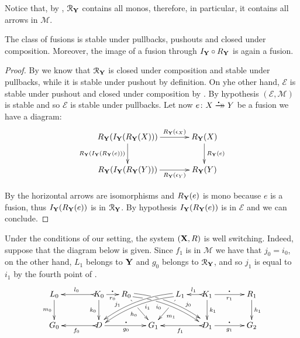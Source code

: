 \documentclass[a4paper,UKenglish,cleveref,pdftex,thm-restate,numberwithinsect]{lipics-v2021}
\newcommand{\xrightarrowdbl}[2][]{%
	\xrightarrow[#1]{#2}\mathrel{\mkern-14mu}\rightarrow
}
\newcommand{\mini}[0]{\scalebox{.4}{$\bullet$}}
\newcommand{\fto}[0]{\xrightarrowdbl{\mini}}
\def\R{\mathsf{R}}
\def\X{\textbf {\textup{X}}}
\def\Y{\textbf {\textup{Y}}}
\def\G{\textbf {\textup{G}}}
\begin{document}
\begin{remark}\label{rem:cont}
	Notice that, by , $\mathcal{R}_\Y$ contains all monos, therefore, in particular, it contains all arrows in $\mathcal{M}$.
\end{remark}

\begin{proposition}\label{prop:fusion}
	The class of fusions is stable under pullbacks, pushouts and closed under composition. Moreover, the image of a fusion through $I_\Y\circ R_{\Y}$ is again a fusion.
\end{proposition}
\begin{proof}
	By  we know that $\mathcal{R}_\Y$ is closed under composition and stable under pullbacks, while it is stable under pushout by definition. On yhe other hand, $\mathcal{E}$ is stable under pushout and closed under composition by . By hypothesis $(\mathcal{E}, \mathcal{M})$ is stable and so $\mathcal{E}$ is stable under pullbacks. Let now $e\colon X\fto Y$ be a fusion we have a diagram:
	\[\xymatrix@C=35pt{R_\Y(I_\Y(R_{\Y}(X))) \ar[r]^-{R_\Y(\epsilon_X)} \ar[d]_{R_\Y(I_\Y(R_\Y(e)))}&R_{\Y}(X) \ar[d]^{R_\Y(e)}\\R_\Y(I_\Y(R_{\Y}(Y))) \ar[r]_-{R_\Y(\epsilon_Y)}&R_\Y(Y)}\]
	
	By  the horizontal arrows are isomorphisms and $R_\Y(e)$ is mono because $e$ is a fusion, thus $I_\Y(R_\Y(e))$ is in $\mathcal{R}_\Y$. By hypothesis $I_\Y(R_\Y(e))$ is in $\mathcal{E}$ and we can conclude.
\end{proof}

\begin{example}
\end{example}

\begin{remark}\label{rem:ws}
Under the conditions of our setting, the system $(\X, \R)$ is well switching. Indeed, suppose that the diagram below is given. Since $f_1$ is in $\mathcal{M}$ we have that $j_0=i_0$, on the other hand, $L_1$ belongs to $\Y$ and $g_0$ belongs to $\mathcal{R}_\Y$, and so $j_1$ is equal to $i_1$ by the fourth point of .
	\[\xymatrix@C=15pt{L_0 \ar[d]_{m_0}&& K_0 \ar[d]_{k_0}\ar@{>->}[ll]_{l_0} \ar[r]_{r_0}^{\mini} & R_0 \ar@/^.3cm/@<-.5ex>[drrr]|(.22)\hole|(.32)\hole_(.4){i_0} \ar@<.5ex>@/^.3cm/[drrr]|(.3)\hole|(.39)\hole^(.7){j_0} \ar[dr]|(.29)\hole|(.35)\hole_{h_0} && L_1 \ar@<.5ex>@/_.3cm/[dlll]^(.4){i_1} \ar@<-.5ex>@/_.3cm/[dlll]_(.7){j_1} \ar[dl]|(.29)\hole|(.35)\hole^(.6){m_1}& K_1\ar[d]^{k_1}\ar@{>->}[l]_{l_1} \ar[rr]_{r_1}^{\mini} && R_1 \ar[d]^{h_1}\\G_0 && \ar@{>->}[ll]^{f_0} D \ar[rr]_{g_0}^{\mini}&& G_1  && \ar@{>->}[ll]^{f_1} D_1 \ar[rr]_{g_1}^{\mini}&& G_2}\]	
\end{remark}
\end{document}
